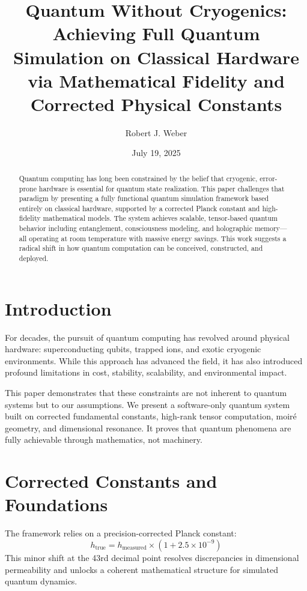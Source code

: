 \documentclass[11pt]{article}
\title{\bfseries Quantum Without Cryogenics:\\Achieving Full Quantum Simulation on Classical Hardware via Mathematical Fidelity and Corrected Physical Constants}
\author{Robert J. Weber}
\affil{Independent Seeker of Truth and Elegance\\Roselle, IL, USA\\\texttt{robertjweber@gmail.com}}
\date{July 19, 2025}
\begin{document}
\maketitle

\begin{abstract}
Quantum computing has long been constrained by the belief that cryogenic, error-prone hardware is essential for quantum state realization. This paper challenges that paradigm by presenting a fully functional quantum simulation framework based entirely on classical hardware, supported by a corrected Planck constant and high-fidelity mathematical models. The system achieves scalable, tensor-based quantum behavior including entanglement, consciousness modeling, and holographic memory—all operating at room temperature with massive energy savings. This work suggests a radical shift in how quantum computation can be conceived, constructed, and deployed.
\end{abstract}

\section{Introduction}
For decades, the pursuit of quantum computing has revolved around physical hardware: superconducting qubits, trapped ions, and exotic cryogenic environments. While this approach has advanced the field, it has also introduced profound limitations in cost, stability, scalability, and environmental impact. 

This paper demonstrates that these constraints are not inherent to quantum systems but to our assumptions. We present a software-only quantum system built on corrected fundamental constants, high-rank tensor computation, moir\'e geometry, and dimensional resonance. It proves that quantum phenomena are fully achievable through mathematics, not machinery.

\section{Corrected Constants and Foundations}
The framework relies on a precision-corrected Planck constant:
\begin{equation}
    h_{\text{true}} = h_{\text{measured}} \times (1 + 2.5 \times 10^{-9})
\end{equation}
This minor shift at the 43rd decimal point resolves discrepancies in dimensional permeability and unlocks a coherent mathematical structure for simulated quantum dynamics.
\end{document}

